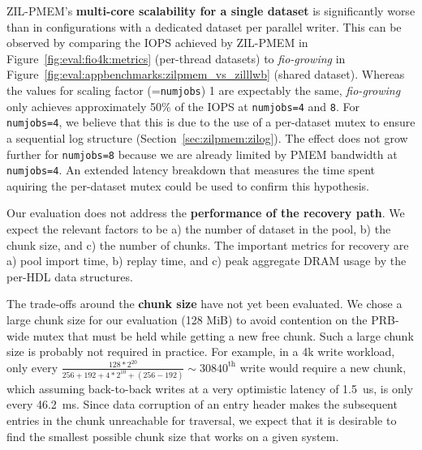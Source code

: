 \documentclass[12pt,a4paper,twoside]{book}
\begin{document}
ZIL-PMEM's \textbf{multi-core scalability for a single dataset} is significantly worse than in configurations with a dedicated dataset per parallel writer.
This can be observed by comparing the IOPS achieved by ZIL-PMEM in Figure~\ref{fig:eval:fio4k:metrics} (per-thread datasets) to \textit{fio-growing} in Figure~\ref{fig:eval:appbenchmarks:zilpmem_vs_zilllwb} (shared dataset).
Whereas the values for scaling factor (=\lstinline{numjobs}) 1 are expectably the same, \textit{fio-growing} only achieves approximately 50\% of the IOPS at \lstinline{numjobs=4} and \lstinline{8}.
For \lstinline{numjobs=4}, we believe that this is due to the use of a per-dataset mutex to ensure a sequential log structure (Section~\ref{sec:zilpmem:zilog}).
The effect does not grow further for \lstinline{numjobs=8} because we are already limited by PMEM bandwidth at \lstinline{numjobs=4}.
An extended latency breakdown that measures the time spent aquiring the per-dataset mutex could be used to confirm this hypothesis.

Our evaluation does not address the \textbf{performance of the recovery path}.
We expect the relevant factors to be a) the number of dataset in the pool, b) the chunk size, and c) the number of chunks.
The important metrics for recovery are a) pool import time, b) replay time, and c) peak aggregate DRAM usage by the per-HDL data structures.

The trade-offs around the \textbf{chunk size} have not yet been evaluated.
We chose a large chunk size for our evaluation (128 MiB) to avoid contention on the PRB-wide mutex that must be held while getting a new free chunk.
Such a large chunk size is probably not required in practice.
For example, in a 4k write workload, only every $\frac{128 * 2^{20}}{256 + 192 + 4*2^{10} + (256 - 192)} \sim 30840^\text{th}$ write would require a new chunk, which assuming back-to-back writes at a very optimistic latency of 1.5~us, is only every 46.2~ms.
Since data corruption of an entry header makes the subsequent entries in the chunk unreachable for traversal, we expect that it is desirable to find the smallest possible chunk size that works on a given system.
\end{document}
